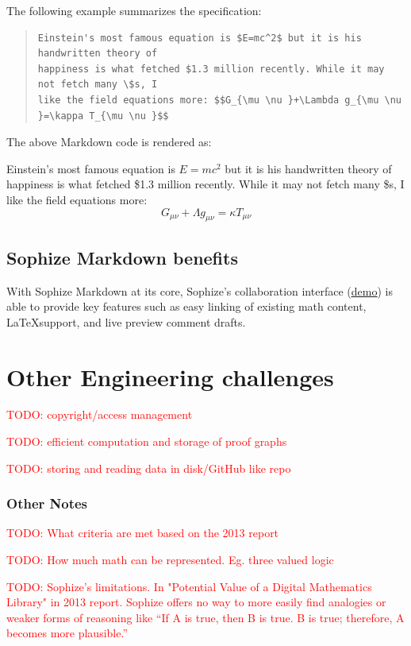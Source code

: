 \documentclass[a4paper]{article}
\newcommand\todo[1]{\textcolor{red}{TODO: #1}}
\begin{document}
The following example summarizes the specification:
\begin{quote}
\begin{verbatim} 
Einstein's most famous equation is $E=mc^2$ but it is his handwritten theory of 
happiness is what fetched $1.3 million recently. While it may not fetch many \$s, I 
like the field equations more: $$G_{\mu \nu }+\Lambda g_{\mu \nu }=\kappa T_{\mu \nu }$$
\end{verbatim}
\end{quote}


The above Markdown code is rendered as:
\begin{mdframed}
Einstein's most famous equation is $E=mc^2$ but it is his handwritten theory of happiness is
what fetched \$1.3 million recently. While it may not fetch many \$s, I like the field
equations more: $$G_{\mu \nu }+\Lambda g_{\mu \nu }=\kappa T_{\mu \nu }$$
\end{mdframed}

\subsection{Sophize Markdown benefits}

With Sophize Markdown at its core, Sophize's collaboration interface\cite{todo}  (\underline{\href{https://youtu.be/d3gaalJ7UQM}{demo}}) is able to provide key features such as easy linking of existing math content, \LaTeX\space support, and live preview comment drafts.

\section{Other Engineering challenges}
\todo{copyright/access management}

\todo{efficient computation and storage of proof graphs}

\todo{ storing and reading data in disk/GitHub like repo }
\subsubsection{Other Notes}
\todo{What criteria are met based on the 2013 report}

\todo{How much math can be represented. Eg. three valued logic}

\todo{Sophize's limitations. In "Potential Value of a
Digital Mathematics Library" in 2013 report. Sophize offers no way to more easily find analogies or weaker forms of reasoning like “If A is true, then B is true. B is true; therefore, A becomes more plausible.” }

 


\end{document}
